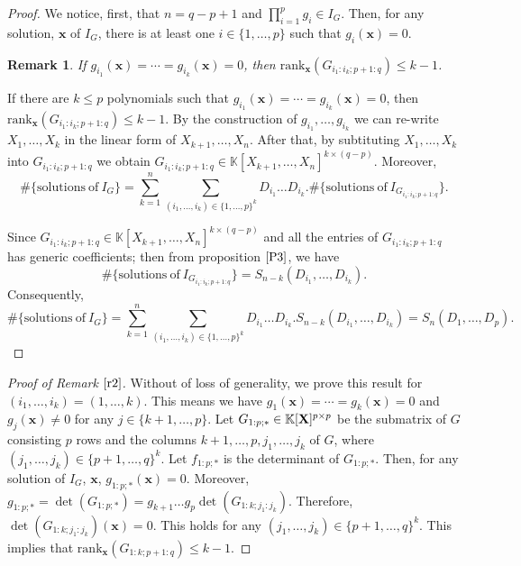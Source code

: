 \documentclass[11pt]{article}
\numberwithin{Property}{section}
\numberwithin{Theorem}{section}
\numberwithin{Proposition}{section}
\numberwithin{Lemma}{section}
\numberwithin{Corollary}{section}
\numberwithin{Definition}{section}
\newtheorem{Remark}{Remark}%
\numberwithin{Remark}{section}
\numberwithin{Conjecture}{section}
\numberwithin{Problem}{section}
\numberwithin{Example}{section}
\numberwithin{Claim}{section}
\renewcommand{\leq}{\leqslant}
\newcommand{\field}{\mathbb{K}} %
\newcommand{\mat}[1]{\mathbf{\MakeUppercase{#1}}} %
\begin{document}
\begin{proof}
We notice, first, that $n = q-p+1$ and $\prod_{i=1}^p g_i \in I_G$. Then, for any solution, $\mathbf{x}$ of $I_G$, there is at least one $i \in \{1, \ldots, p\}$ such that $g_i(\mathbf{x}) = 0$. 
\begin{Remark} \label{r2}
If $g_{i_1}(\mathbf{x}) = \cdots = g_{i_k}(\mathbf{x}) = 0$, then $\mathrm{rank}_{\mathbf{x}}(G_{i_1:i_k\mathbf{;}p+1:q}) \leq k-1$.
\end{Remark}
If there are $k \leq p$ polynomials such that $g_{i_1}(\mathbf{x}) = \cdots = g_{i_k}(\mathbf{x}) = 0$, then $\mathrm{rank}_{\mathbf{x}}(G_{i_1:i_k\mathbf{;}p+1:q}) \leq k-1$. By the construction of $g_{i_1}, \ldots, g_{i_k}$ we can re-write $X_1, \ldots, X_k$ in the linear form of $X_{k+1}, \ldots, X_{n}$. After that, by subtituting $X_1, \ldots, X_k$ into $G_{i_1:i_k\mathbf{;}p+1:q}$ we obtain $G_{i_1:i_k\mathbf{;}p+1:q} \in \field[X_{k+1}, \ldots, X_n]^{k \times (q-p)}$. Moreover,
\[
\# \{\mathrm{solutions \ of \ } I_G \} =\sum_{k=1}^n \sum_{(i_1, \ldots, i_k) \in \{1, \ldots, p\}^k}D_{i_1} \ldots D_{i_k} . \# \{\mathrm{solutions \ of \ } I_{G_{i_1:i_k\mathbf{;}p+1:q}}\}.
\]

Since $G_{i_1:i_k\mathbf{;}p+1:q} \in \field[X_{k+1}, \ldots, X_{n}]^{k \times (q-p)}$ and all the entries of $G_{i_1:i_k\mathbf{;}p+1:q} $ has generic coefficients; then from proposition $\ref{P3}$, we have 
\[
 \# \{\mathrm{solutions \ of \ } I_{G_{i_1:i_k\mathbf{;}p+1:q}}\} = S_{n-k}(D_{i_1}, \ldots, D_{i_k}).
\]
Consequently, 
\[
\# \{\mathrm{solutions \ of \ } I_G \} =\sum_{k=1}^n \sum_{(i_1, \ldots, i_k) \in \{1, \ldots, p\}^k}D_{i_1} \ldots D_{i_k} . S_{n-k}(D_{i_1}, \ldots, D_{i_k}) = S_n(D_{1}, \ldots, D_{p}).
\]
\end{proof}

\begin{proof}[Proof of Remark $\ref{r2}$] Without of loss of generality, we prove this result for $(i_1, \ldots, i_k) = (1, \ldots, k)$. This means we have $g_1(\mathbf{x}) = \cdots = g_{k}(\mathbf{x}) = 0$ and $g_{j}(\mathbf{x}) \ne 0$ for any $j \in \{k+1, \ldots, p\}$. Let $G_{1:p;*} \in \field[\mat{X}]^{p \times p}$ be the submatrix of $G$ consisting $p$ rows and the columns $k+1, \ldots, p, j_1, \ldots, j_k$ of $G$, where $(j_1, \ldots, j_k) \in \{p+1, \ldots, q\}^{k}$. Let $f_{1:p;*}$ is the determinant of $G_{1:p;*}$. Then, for any solution of $I_G$, $\mathbf{x}$, $g_{1:p;*}(\mathbf{x}) = 0$. Moreover, $g_{1:p;*} = \det(G_{1:p;*}) = g_{k+1} \ldots g_p \det(G_{1:k;j_1:j_k})$. Therefore, $\det(G_{1:k;j_1:j_k})(\mathbf{x}) = 0$. This holds for any $(j_1, \ldots, j_k) \in \{p+1, \ldots, q\}^{k}$. This implies that $\mathrm{rank}_{\mathbf{x}}(G_{1:k\mathbf{;}p+1:q}) \leq k-1$. 
\end{proof}
\end{document}
